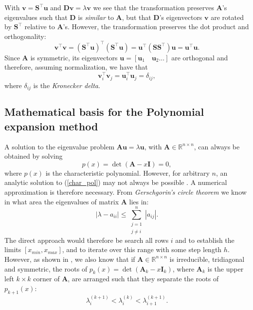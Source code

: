 \documentclass[]{article}
\begin{document}
With $\mathbf{v} = \mathbf{S}^\intercal \mathbf{u}$ and $\mathbf{D} \mathbf{v} = \lambda \mathbf{v}$ we see that the transformation preserves $\mathbf{A}$'s eigenvalues such that $\mathbf{D}$ is \textit{similar} to $\mathbf{A}$, but that $\mathbf{D}$'s eigenvectors $\mathbf{v}$ are rotated by $\mathbf{S}^\intercal$ relative to $\mathbf{A}$'s. However, the transformation preserves the dot product and orthogonality:
\[
\mathbf{v}^\intercal \mathbf{v} = (\mathbf{S}^\intercal \mathbf{u})^\intercal (\mathbf{S}^\intercal \mathbf{u}) = \mathbf{u}^\intercal (\mathbf{S} \mathbf{S}^\intercal) \mathbf{u} = \mathbf{u}^\intercal \mathbf{u}.
\]
Since $\mathbf{A}$ is symmetric, its eigenvectors $\mathbf{u} = [\mathbf{u}_1 \quad \mathbf{u}_2\ldots ]$ are orthogonal and therefore, assuming normalization, we have that
\[
\mathbf{v}^\intercal_i \mathbf{v}_j = \mathbf{u}^\intercal_i \mathbf{u}_j = \delta_{ij},
\]
where $\delta_{ij}$ is the \textit{Kronecker delta}.


\subsection{Mathematical basis for the Polynomial expansion method}
A solution to the eigenvalue problem $\mathbf{Au} = \lambda \mathbf{u}$, with $\mathbf{A} \in \mathbb{R}^{n \times n}$, can always be obtained by solving 
\begin{equation}
\label{char_pol}
p(x) = \det(\mathbf{A} - x\mathbf{I}) = 0,
\end{equation}
where $p(x)$ is the characteristic polynomial. However, for arbitrary $n$, an analytic solution to (\ref{char_pol}) may not always be possible \cite{fys4150-notes}. A numerical approximation is therefore necessary. From \textit{Gerschgorin's circle theorem} \cite{mat-inf4130} we know in what area the eigenvalues of matrix $\mathbf{A}$ lies in:
\[
|\lambda - a_{ii}| \leq \sum_{\substack{j=1 \\ j \neq i}}^{n} |a_{ij}|.
\]
The direct approach would therefore be search all rows $i$ and to establish the limits $[x_{min}, x_{max}]$, and to iterate over this range with some step length $h$. However, as shown in \cite{mat-inf4130}, we also know that if $\mathbf{A} \in \mathbb{R}^{n \times n}$ is irreducible, tridiagonal and symmetric, the roots of $p_k(x) = \det(\mathbf{A}_k - x\mathbf{I}_k)$, where $\mathbf{A}_k$ is the upper left $k \times k$ corner of $\mathbf{A}$, are arranged such that they separate the roots of $p_{k+1}(x)$:
\[
\lambda_i^{(k+1)} < \lambda_i^{(k)} < \lambda_{i+1}^{(k+1)}.
\]
\end{document}
